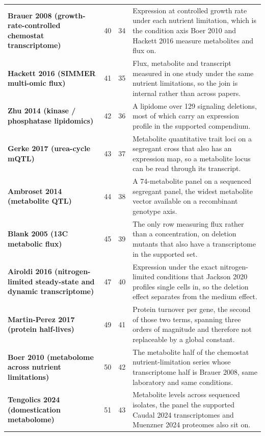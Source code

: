 \begin{longtable}{@{}L{46mm} r@{\hspace{6pt}} r@{\hspace{6pt}} L{104mm}@{}}
\addlinespace[5pt]
\textbf{Brauer 2008 (growth-rate-controlled chemostat transcriptome)} & 40 & 34 & Expression at controlled growth rate under each nutrient limitation, which is the condition axis Boer 2010 and Hackett 2016 measure metabolites and flux on. \\
\addlinespace[5pt]
\textbf{Hackett 2016 (SIMMER multi-omic flux)} & 41 & 35 & Flux, metabolite and transcript measured in one study under the same nutrient limitations, so the join is internal rather than across papers. \\
\addlinespace[5pt]
\textbf{Zhu 2014 (kinase / phosphatase lipidomics)} & 42 & 36 & A lipidome over 129 signaling deletions, most of which carry an expression profile in the supported compendium. \\
\addlinespace[5pt]
\textbf{Gerke 2017 (urea-cycle mQTL)} & 43 & 37 & Metabolite quantitative trait loci on a segregant cross that also has an expression map, so a metabolite locus can be read through its transcript. \\
\addlinespace[5pt]
\textbf{Ambroset 2014 (metabolite QTL)} & 44 & 38 & A 74-metabolite panel on a sequenced segregant panel, the widest metabolite vector available on a recombinant genotype axis. \\
\addlinespace[5pt]
\textbf{Blank 2005 (13C metabolic flux)} & 45 & 39 & The only row measuring flux rather than a concentration, on deletion mutants that also have a transcriptome in the supported set. \\
\addlinespace[5pt]
\textbf{Airoldi 2016 (nitrogen-limited steady-state and dynamic transcriptome)} & 47 & 40 & Expression under the exact nitrogen-limited conditions that Jackson 2020 profiles single cells in, so the deletion effect separates from the medium effect. \\
\addlinespace[5pt]
\textbf{Martin-Perez 2017 (protein half-lives)} & 49 & 41 & Protein turnover per gene, the second of those two terms, spanning three orders of magnitude and therefore not replaceable by a global constant. \\
\addlinespace[5pt]
\textbf{Boer 2010 (metabolome across nutrient limitations)} & 50 & 42 & The metabolite half of the chemostat nutrient-limitation series whose transcriptome half is Brauer 2008, same laboratory and same conditions. \\
\addlinespace[5pt]
\textbf{Tengolics 2024 (domestication metabolome)} & 51 & 43 & Metabolite levels across sequenced isolates, the panel the supported Caudal 2024 transcriptomes and Muenzner 2024 proteomes also sit on. \\

\end{longtable}
